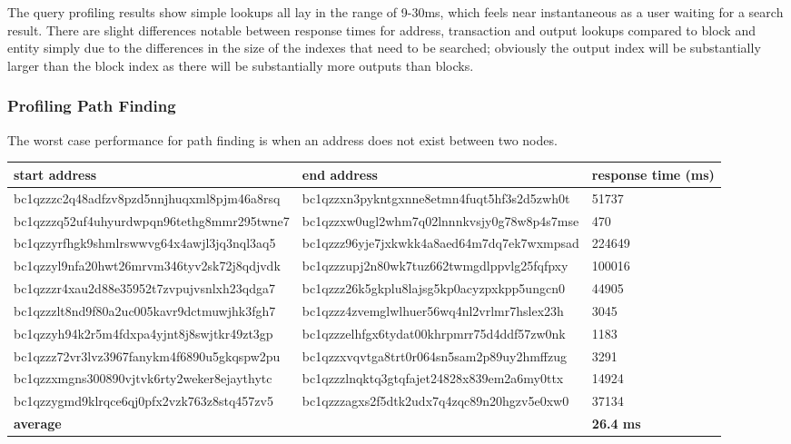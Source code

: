\\\\
The query profiling results show simple lookups all lay in the range of 9-30ms, which feels near instantaneous as a user waiting for a search result. There are slight differences notable between response times for address, transaction and output lookups compared to block and entity simply due to the differences in the size of the indexes that need to be searched; obviously the output index will be substantially larger than the block index as there will be substantially more outputs than blocks. 

\subsubsection{Profiling Path Finding}\label{evaluation:path-finding-profile}
The worst case performance for path finding is when an address does not exist between two nodes. 

\begin{center}
\begin{tabular}{ |p{5.5cm}|p{5.5cm}| p{3cm} |} 
 \hline
\textbf{start address} & \textbf{end address} & \textbf{response} \textbf{time (ms)} \\\hline
bc1qzzzc2q48adfzv8p\-zd5nnjhuqxml8pjm46a8rsq & bc1qzzxn3pykntgxnne\-8etmn4fuqt5hf3s2d5zwh0t & 51737 \\\hline
bc1qzzzq52uf4uhyurd\-wpqn96tethg8mmr295twne7 & bc1qzzxw0ugl2whm7q0\-2lnnnkvsjy0g78w8p4s7mse & 470 \\\hline
bc1qzzyrfhgk9shmlrs\-wwvg64x4awjl3jq3nql3aq5 & bc1qzzz96yje7jxkwkk\-4a8aed64m7dq7ek7wxmpsad & 224649 \\\hline
bc1qzzyl9nfa20hwt26\-mrvm346tyv2sk72j8qdjvdk & bc1qzzzupj2n80wk7tu\-z662twmgdlppvlg25fqfpxy & 100016 \\\hline
bc1qzzzr4xau2d88e35\-952t7zvpujvsnlxh23qdga7 & bc1qzzz26k5gkplu8la\-jsg5kp0acyzpxkpp5ungcn0 & 44905 \\\hline
bc1qzzzlt8nd9f80a2u\-c005kavr9dctmuwjhk3fgh7 & bc1qzzz4zvemglwlhue\-r56wq4nl2vrlmr7hslex23h & 3045 \\\hline
bc1qzzyh94k2r5m4fdx\-pa4yjnt8j8swjtkr49zt3gp & bc1qzzzelhfgx6tydat\-00khrpmrr75d4ddf57zw0nk & 1183 \\\hline
bc1qzzz72vr3lvz3967\-fanykm4f6890u5gkqspw2pu & bc1qzzxvqvtga8trt0r\-064sn5sam2p89uy2hmffzug & 3291 \\\hline
bc1qzzxmgns300890vj\-tvk6rty2weker8ejaythytc & bc1qzzzlnqktq3gtqfa\-jet24828x839em2a6my0ttx & 14924 \\\hline
bc1qzzygmd9klrqce6q\-j0pfx2vzk763z8stq457zv5 & bc1qzzzagxs2f5dtk2u\-dx7q4zqc89n20hgzv5e0xw0 & 37134 \\
\hline \textbf{average} & & \textbf{26.4 ms} \\\hline
\end{tabular}
\end{center}

